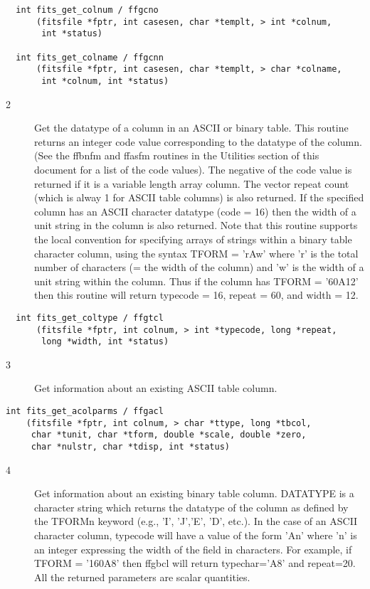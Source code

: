 \begin{verbatim}
  int fits_get_colnum / ffgcno
      (fitsfile *fptr, int casesen, char *templt, > int *colnum,
       int *status)

  int fits_get_colname / ffgcnn
      (fitsfile *fptr, int casesen, char *templt, > char *colname,
       int *colnum, int *status)
\end{verbatim}

\begin{description}
\item[2 ] Get the datatype of a column in an ASCII or binary table.  This routine
    returns an integer code value corresponding to the datatype of the column.
    (See the ffbnfm and ffasfm routines in the Utilities section of this document
    for a list of the code values).  The negative of the code value is returned
    if it is a variable length array column. The vector
    repeat count (which is alway 1 for ASCII table columns) is also returned.
    If the specified column has an ASCII character datatype (code = 16) then
    the width of a unit string in the column is also returned.  Note that
    this routine supports the local convention for specifying arrays of
    strings within a binary table character column, using the syntax
    TFORM = 'rAw' where 'r' is the total number of characters (= the width
    of the column) and 'w' is the width of a unit string within the column.
    Thus if the column has TFORM = '60A12' then this routine will return
   typecode = 16, repeat = 60, and width = 12.
\end{description}

\begin{verbatim}
  int fits_get_coltype / ffgtcl
      (fitsfile *fptr, int colnum, > int *typecode, long *repeat,
       long *width, int *status)
\end{verbatim}

\begin{description}
\item[3 ] Get information about an existing ASCII table column.
\end{description}

\begin{verbatim}
int fits_get_acolparms / ffgacl
    (fitsfile *fptr, int colnum, > char *ttype, long *tbcol,
     char *tunit, char *tform, double *scale, double *zero,
     char *nulstr, char *tdisp, int *status)
\end{verbatim}

\begin{description}
\item[4 ] Get information about an existing binary table column. DATATYPE is a
    character string which returns the datatype of the column as defined
    by the TFORMn keyword (e.g., 'I', 'J','E', 'D', etc.).  In the case
    of an ASCII character column, typecode will have a value of the
    form 'An' where 'n' is an integer expressing the width of the field
    in characters.  For example, if TFORM = '160A8' then ffgbcl will return
    typechar='A8' and repeat=20.   All the returned parameters are scalar
   quantities.
\end{description}

